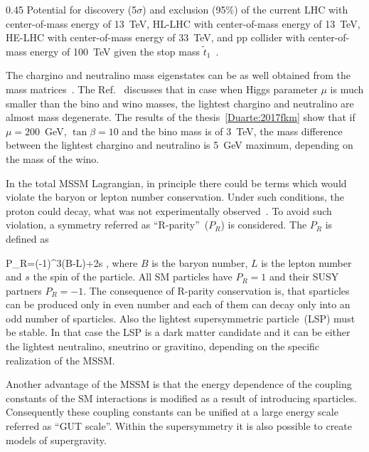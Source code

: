                 {0.45}       %
                 { Potential for discovery (5$\sigma$) and exclusion (95\%) of the current LHC with center-of-mass energy of 13~TeV, HL-LHC with center-of-mass energy of 13~TeV, HE-LHC with center-of-mass energy of 33~TeV,  and pp collider with center-of-mass energy of 100~TeV given the stop mass $\tilde{t}_{1}$~\cite{Baer:2016bwh}.  }


The chargino and neutralino mass eigenstates can be as well obtained from the mass matrices~\cite{Martin:1997ns}. The Ref.~\cite{Gunion:1987yh} discusses that in case when Higgs parameter $\mu$ is much smaller than the bino and wino masses, the lightest chargino and neutralino are almost mass degenerate. The results of the thesis~\ref{Duarte:2017fkm} show that if $\mu = 200$~GeV, $\tan \beta =10$ and the bino mass is of 3~TeV, the mass difference between the lightest chargino and neutralino is 5~GeV maximum, depending on the mass of the wino.

In the total MSSM Lagrangian, in principle there could be terms which would violate the baryon or lepton number conservation. Under such conditions, the proton could decay, what was not experimentally observed~\cite{Nishino:2009aa}. To avoid such violation, a symmetry referred as ``R-parity''~($P_{R}$) is considered. The $P_{R}$ is defined as

{
P_R=(-1)^{3(B-L)+2s },
}
where $B$ is the baryon number, $L$ is the lepton number and $s$ the spin of the particle. All SM particles have $P_{R}=1$ and their SUSY partners $P_{R}=-1$. The consequence of R-parity conservation is, that sparticles can be produced only in even number and each of them can decay only into an odd number of sparticles. Also the lightest supersymmetric particle~(LSP) must be stable. In that case the LSP is a dark matter candidate and it can be either the lightest neutralino, sneutrino or gravitino, depending on the specific realization of the MSSM. 



Another advantage of the MSSM is that the energy dependence of the coupling constants of the SM interactions is modified as a result of introducing sparticles. Consequently these coupling constants can be unified at a large energy scale referred as ``GUT scale''. Within the supersymmetry it is also possible to create models of supergravity.

